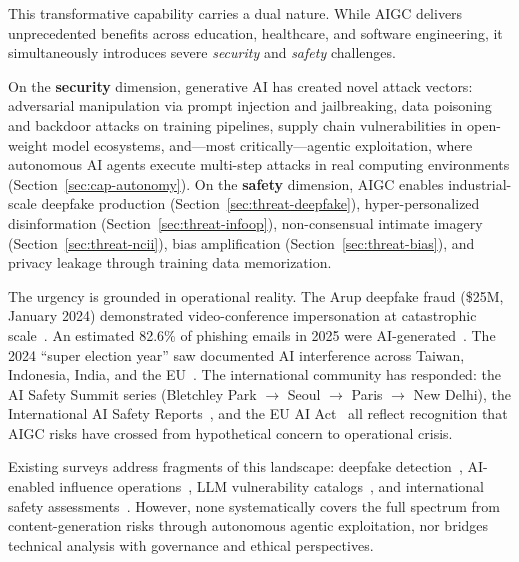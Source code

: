 
This transformative capability carries a dual nature. While AIGC delivers unprecedented benefits across education, healthcare, and software engineering, it simultaneously introduces severe \emph{security} and \emph{safety} challenges.

On the \textbf{security} dimension, generative AI has created novel attack vectors: adversarial manipulation via prompt injection and jailbreaking, data poisoning and backdoor attacks on training pipelines, supply chain vulnerabilities in open-weight model ecosystems, and---most critically---agentic exploitation, where autonomous AI agents execute multi-step attacks in real computing environments (Section~\ref{sec:cap-autonomy}). On the \textbf{safety} dimension, AIGC enables industrial-scale deepfake production (Section~\ref{sec:threat-deepfake}), hyper-personalized disinformation (Section~\ref{sec:threat-infoop}), non-consensual intimate imagery (Section~\ref{sec:threat-ncii}), bias amplification (Section~\ref{sec:threat-bias}), and privacy leakage through training data memorization.

The urgency is grounded in operational reality. The Arup deepfake fraud (\$25M, January 2024) demonstrated video-conference impersonation at catastrophic scale~\cite{brightside2025phishing}. An estimated 82.6\% of phishing emails in 2025 were AI-generated~\cite{knowbe4_2025}. The 2024 ``super election year'' saw documented AI interference across Taiwan, Indonesia, India, and the EU~\cite{restofworld2024tracker}. The international community has responded: the AI Safety Summit series (Bletchley Park $\to$ Seoul $\to$ Paris $\to$ New Delhi), the International AI Safety Reports~\cite{aisafetyreport2025,aisafetyreport2026}, and the EU AI Act~\cite{euaiact2024} all reflect recognition that AIGC risks have crossed from hypothetical concern to operational crisis.


Existing surveys address fragments of this landscape: deepfake detection~\cite{pei2024deepfakesurvey}, AI-enabled influence operations~\cite{spitale2023gpt3}, LLM vulnerability catalogs~\cite{owasp2025}, and international safety assessments~\cite{aisafetyreport2025,aisafetyreport2026}. However, none systematically covers the full spectrum from content-generation risks through autonomous agentic exploitation, nor bridges technical analysis with governance and ethical perspectives.

